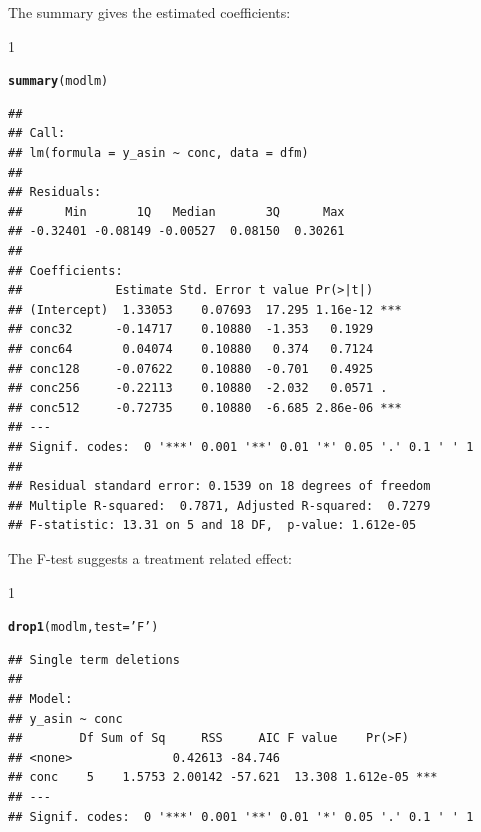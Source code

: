 \documentclass{scrartcl}\usepackage[]{graphicx}\usepackage[]{color}
\makeatletter
\newcommand{\hlstr}[1]{\textcolor[rgb]{0.192,0.494,0.8}{#1}}%
\newcommand{\hlstd}[1]{\textcolor[rgb]{0.345,0.345,0.345}{#1}}%
\newcommand{\hlkwc}[1]{\textcolor[rgb]{0.333,0.667,0.333}{#1}}%
\newcommand{\hlkwd}[1]{\textcolor[rgb]{0.737,0.353,0.396}{\textbf{#1}}}%
\newenvironment{kframe}{%
 \def\at@end@of@kframe{}%
 \ifinner\ifhmode%
  \def\at@end@of@kframe{\end{minipage}}%
  \begin{minipage}{\columnwidth}%
 \fi\fi%
 \def\FrameCommand##1{\hskip\@totalleftmargin \hskip-\fboxsep
 \colorbox{shadecolor}{##1}\hskip-\fboxsep
     \hskip-\linewidth \hskip-\@totalleftmargin \hskip\columnwidth}%
 \MakeFramed {\advance\hsize-\width
   \@totalleftmargin\z@ \linewidth\hsize
   \@setminipage}}%
 {\par\unskip\endMakeFramed%
 \at@end@of@kframe}
\newenvironment{knitrout}{}{} %
\renewenvironment{knitrout}{\begin{spacing}{1}}{\end{spacing}}
\makeatother
\begin{document}
The summary gives the estimated coefficients:
\begin{knitrout}
\color{fgcolor}\begin{kframe}
\begin{alltt}
\hlkwd{summary}\hlstd{(modlm)}
\end{alltt}
\begin{verbatim}
## 
## Call:
## lm(formula = y_asin ~ conc, data = dfm)
## 
## Residuals:
##      Min       1Q   Median       3Q      Max 
## -0.32401 -0.08149 -0.00527  0.08150  0.30261 
## 
## Coefficients:
##             Estimate Std. Error t value Pr(>|t|)    
## (Intercept)  1.33053    0.07693  17.295 1.16e-12 ***
## conc32      -0.14717    0.10880  -1.353   0.1929    
## conc64       0.04074    0.10880   0.374   0.7124    
## conc128     -0.07622    0.10880  -0.701   0.4925    
## conc256     -0.22113    0.10880  -2.032   0.0571 .  
## conc512     -0.72735    0.10880  -6.685 2.86e-06 ***
## ---
## Signif. codes:  0 '***' 0.001 '**' 0.01 '*' 0.05 '.' 0.1 ' ' 1
## 
## Residual standard error: 0.1539 on 18 degrees of freedom
## Multiple R-squared:  0.7871,	Adjusted R-squared:  0.7279 
## F-statistic: 13.31 on 5 and 18 DF,  p-value: 1.612e-05
\end{verbatim}
\end{kframe}
\end{knitrout}

The F-test suggests a treatment related effect:
\begin{knitrout}
\color{fgcolor}\begin{kframe}
\begin{alltt}
\hlkwd{drop1}\hlstd{(modlm,} \hlkwc{test} \hlstd{=} \hlstr{'F'}\hlstd{)}
\end{alltt}
\begin{verbatim}
## Single term deletions
## 
## Model:
## y_asin ~ conc
##        Df Sum of Sq     RSS     AIC F value    Pr(>F)    
## <none>              0.42613 -84.746                      
## conc    5    1.5753 2.00142 -57.621  13.308 1.612e-05 ***
## ---
## Signif. codes:  0 '***' 0.001 '**' 0.01 '*' 0.05 '.' 0.1 ' ' 1
\end{verbatim}
\end{kframe}
\end{knitrout}
\end{document}
